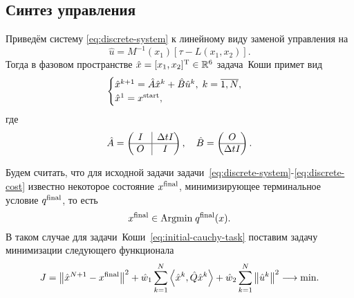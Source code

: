 \documentclass[../../doc.tex]{subfiles}
\begin{document}
    \subsection{Синтез управления}

    Приведём систему \eqref{eq:discrete-system} к линейному виду заменой управления на
    \begin{equation}\label{eq:initial-control-definition}
        \hat u = M^{-1}(x_1)[\tau - L(x_1, x_2)].
    \end{equation}
    Тогда в фазовом пространстве $\hat x = [x_1, x_2]^\textnormal{T} \in \mathbb{R}^{6}$ задача~Коши примет вид
    \begin{equation}\label{eq:initial-cauchy-task}
        \begin{cases}
            \hat x^{k+1} = \hat A \hat x^{k} + \hat B \hat u^{k},\; k=\overline{1,N},
            \\
            \hat x^{1} = x^{\textnormal{start}},
        \end{cases}
    \end{equation}
    где
    \begin{equation*}
        \hat A
        =
        \begin{pmatrix}
            \;I\; & \hspace*{-\arraycolsep}\vline\hspace*{-\arraycolsep} & \Delta t I
            \\
            \hline
            \;O\; & \hspace*{-\arraycolsep}\vline\hspace*{-\arraycolsep} & I
        \end{pmatrix}
        ,\quad
        \hat B
        =
        \begin{pmatrix}
            O
            \\
            \hline
            \Delta t I
        \end{pmatrix}
        .
    \end{equation*}

    Будем считать, что для исходной задачи задачи~\eqref{eq:discrete-system}-\eqref{eq:discrete-cost} известно некоторое состояние $x^{\textnormal{final}}$, минимизирующее терминальное условие $q^{\textnormal{final}}$, то есть
    \begin{equation*}\label{eq:initial-x-final-definition}
        x^{\textnormal{final}} \in \textnormal{Argmin}\; q^{\textnormal{final}}(x).
    \end{equation*}
    В таком случае для задачи~Коши~\eqref{eq:initial-cauchy-task} поставим задачу минимизации следующего функционала
    \begin{equation}\label{eq:initial-cost-definition}
        J
        =
            \left\| \hat x^{N+1} - x^{\textnormal{final}} \right\|^2
            +
            \hat w_1 \sum_{k=1}^{N} \left\langle \hat x^k, \hat Q \hat x^k \right\rangle
            +
            \hat w_2 \sum_{k=1}^{N} \left\| \hat u^k \right\|^2
        \longrightarrow
        \textnormal{min}.
    \end{equation}
    
\end{document}
